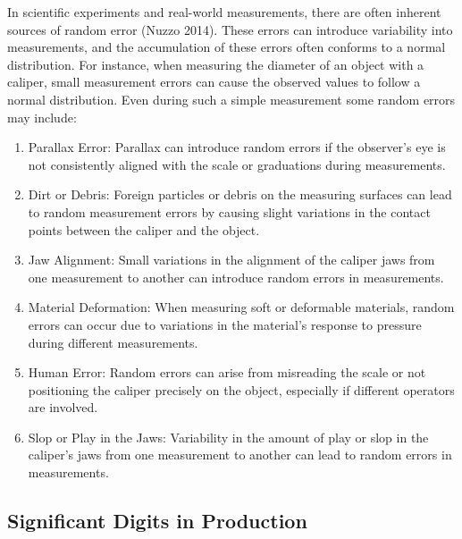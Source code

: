 \documentclass[
  a4paper,
]{scrbook}
\begin{document}
In scientific experiments and real-world measurements, there are often
inherent sources of random error (Nuzzo 2014). These errors can
introduce variability into measurements, and the accumulation of these
errors often conforms to a normal distribution. For instance, when
measuring the diameter of an object with a caliper, small measurement
errors can cause the observed values to follow a normal distribution.
Even during such a simple measurement some random errors may include:

\begin{enumerate}
\def\labelenumi{\arabic{enumi}.}
\item
  Parallax Error: Parallax can introduce random errors if the observer's
  eye is not consistently aligned with the scale or graduations during
  measurements.
\item
  Dirt or Debris: Foreign particles or debris on the measuring surfaces
  can lead to random measurement errors by causing slight variations in
  the contact points between the caliper and the object.
\item
  Jaw Alignment: Small variations in the alignment of the caliper jaws
  from one measurement to another can introduce random errors in
  measurements.
\item
  Material Deformation: When measuring soft or deformable materials,
  random errors can occur due to variations in the material's response
  to pressure during different measurements.
\item
  Human Error: Random errors can arise from misreading the scale or not
  positioning the caliper precisely on the object, especially if
  different operators are involved.
\item
  Slop or Play in the Jaws: Variability in the amount of play or slop in
  the caliper's jaws from one measurement to another can lead to random
  errors in measurements.
\end{enumerate}

\subsection{Significant Digits in
Production}\label{significant-digits-in-production}
\end{document}

